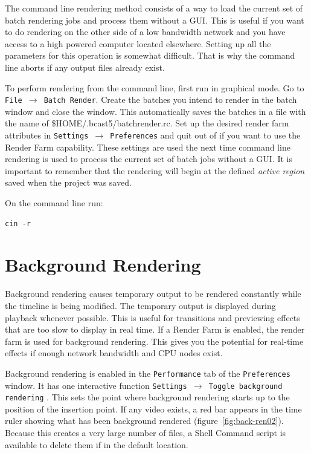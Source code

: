 The command line rendering method consists of a way to load the
current set of batch rendering jobs and process them without a
GUI\@. This is useful if you want to do rendering on the other side
of a low bandwidth network and you have access to a high powered
computer located elsewhere. Setting up all the parameters for this
operation is somewhat difficult. That is why the command line aborts
if any output files already exist.

To perform rendering from the command line, first run \CGG{} in
graphical mode. Go to \texttt{File $\rightarrow$ Batch Render}.
Create the batches you intend to render in the batch window and
close the window.  This automatically saves the batches in a file 
with the name of \$HOME/.bcast5/batchrender.rc. Set up the
desired render farm attributes in \texttt{Settings $\rightarrow$
  Preferences} and quit out of \CGG{} if you want to use the Render
Farm capability.  These settings are used the next time command line
rendering is used to process the current set of batch jobs without a
GUI\@.  It is important to remember that the rendering will begin at
the defined \textit{active region} saved when the project was saved. 

On the command line run:

\begin{lstlisting}[style=sh]
cin -r
\end{lstlisting}

\section{Background Rendering}%
\label{sec:background_rendering}

Background rendering causes temporary output to be rendered
constantly while the timeline is being modified. The temporary
output is displayed during playback whenever possible. This is
useful for transitions and previewing effects that are too slow to
display in real time. If a Render Farm  is enabled, the render farm
is used for background rendering. This gives you the potential for
real-time effects if enough network bandwidth and CPU nodes exist.

Background rendering is enabled in the \texttt{Performance} tab of
the \texttt{Preferences} window. It has one interactive function
\texttt{Settings $\rightarrow$ Toggle background rendering} . This
sets the point where background rendering starts up to the position
of the insertion point. If any video exists, a red bar appears in
the time ruler showing what has been background rendered
(figure~\ref{fig:back-ren02}).  Because this creates a very large number 
of files, a Shell Command script is available to delete them if in the
default location.

